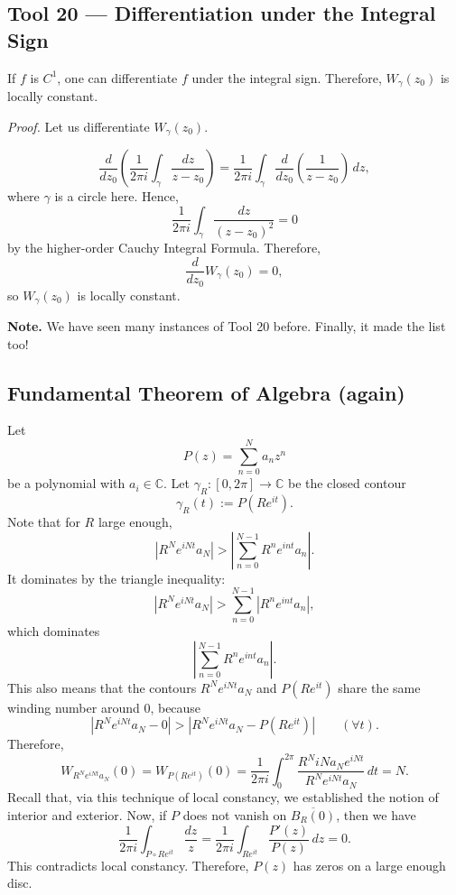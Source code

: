 \documentclass[11pt,a4paper]{article}
\begin{document}
\subsection*{Tool 20 — Differentiation under the Integral Sign}
If \(f\) is \(C^1\), one can differentiate \(f\) under the integral sign. Therefore, \(W_\gamma(z_0)\) is locally constant.


\textit{Proof.}
Let us differentiate \(W_\gamma(z_0)\).


\[
  \frac{d}{dz_0}\left(\frac{1}{2\pi i}\int_\gamma\frac{dz}{z-z_0}\right)
  =\frac{1}{2\pi i}\int_\gamma\frac{d}{dz_0}\left(\frac{1}{z-z_0}\right)\,dz,
\]
where \(\gamma\) is a circle here. Hence,
\[
  \frac{1}{2\pi i}\int_\gamma\frac{dz}{(z-z_0)^2}=0
\]
by the higher-order Cauchy Integral Formula. Therefore,
\[
  \frac{d}{dz_0}W_\gamma(z_0)=0,
\]
so \(W_\gamma(z_0)\) is locally constant.

\textbf{Note.}
We have seen many instances of Tool 20 before. Finally, it made the list too!

\subsection*{Fundamental Theorem of Algebra (again)}
Let
\[
  P(z)=\sum_{n=0}^N a_nz^n
\]
be a polynomial with \(a_i\in\mathbb C\). Let \(\gamma_R:[0,2\pi]\to\mathbb C\) be the closed contour
\[
  \gamma_R(t):=P(Re^{it}).
\]
Note that for \(R\) large enough,
\[
  |R^Ne^{iNt}a_N|>
  \left|\sum_{n=0}^{N-1}R^ne^{int}a_n\right|.
\]
It dominates by the triangle inequality:
\[
  |R^Ne^{iNt}a_N|>
  \sum_{n=0}^{N-1}|R^ne^{int}a_n|,
\]
which dominates
\[
  \left|\sum_{n=0}^{N-1}R^ne^{int}a_n\right|.
\]
This also means that the contours \(R^Ne^{iNt}a_N\) and \(P(Re^{it})\) share the same winding number around \(0\), because
\[
  |R^Ne^{iNt}a_N-0|>|R^Ne^{iNt}a_N-P(Re^{it})|
  \qquad(\forall t).
\]
Therefore,
\[
  W_{R^Ne^{iNt}a_N}(0)=W_{P(Re^{it})}(0)
  =\frac{1}{2\pi i}\int_0^{2\pi}
    \frac{R^NiNa_Ne^{iNt}}{R^Ne^{iNt}a_N}\,dt
  =N.
\]
Recall that, via this technique of local constancy, we established the notion of interior and exterior. Now, if \(P\) does not vanish on \(\overline{B_R(0)}\), then we have
\[
  \frac{1}{2\pi i}\int_{P\circ Re^{it}}\frac{dz}{z}
  =\frac{1}{2\pi i}\int_{Re^{it}}\frac{P'(z)}{P(z)}\,dz=0.
\]
This contradicts local constancy. Therefore, \(P(z)\) has zeros on a large enough disc.
\end{document}
